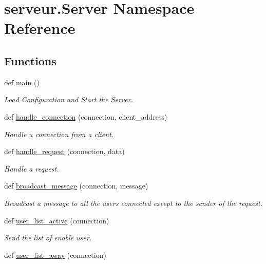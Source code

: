 \hypertarget{namespaceserveur_1_1_server}{}\section{serveur.\+Server Namespace Reference}
\label{namespaceserveur_1_1_server}
\subsection*{Functions}
\begin{DoxyCompactItemize}
\item 
def \hyperlink{namespaceserveur_1_1_server_a707c337588955a442d5c92d610c9400c}{main} ()
\begin{DoxyCompactList}\small\item\em Load Configuration and Start the \hyperlink{namespaceserveur_1_1_server}{Server}. \end{DoxyCompactList}\item 
def \hyperlink{namespaceserveur_1_1_server_aa5901fbb54ba27621b0e5f29e5888444}{handle\+\_\+connection} (connection, client\+\_\+address)
\begin{DoxyCompactList}\small\item\em Handle a connection from a client. \end{DoxyCompactList}\item 
def \hyperlink{namespaceserveur_1_1_server_a844a3af381027a8543410eaf7a4dd93f}{handle\+\_\+request} (connection, data)
\begin{DoxyCompactList}\small\item\em Handle a request. \end{DoxyCompactList}\item 
def \hyperlink{namespaceserveur_1_1_server_aa8b6effcc4dc0218b564730d1cae55c1}{broadcast\+\_\+message} (connection, message)
\begin{DoxyCompactList}\small\item\em Broadcast a message to all the users connected except to the sender of the request. \end{DoxyCompactList}\item 
def \hyperlink{namespaceserveur_1_1_server_a40c77305ecdab5cda4433f70be8eed82}{user\+\_\+list\+\_\+active} (connection)
\begin{DoxyCompactList}\small\item\em Send the list of enable user. \end{DoxyCompactList}\item 
def \hyperlink{namespaceserveur_1_1_server_acb501b38f5951a2e4a0329e637b03654}{user\+\_\+list\+\_\+away} (connection)

\end{DoxyCompactItemize}
